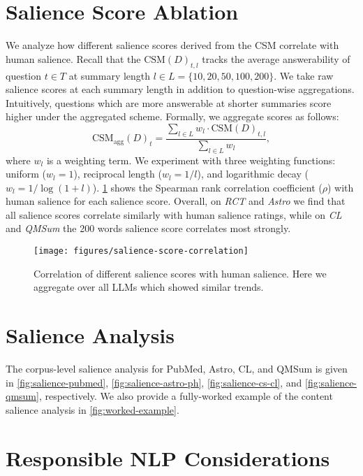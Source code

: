 \section{Salience Score Ablation}
\label{sec:appendix-salience-score-ablation}
We analyze how different salience scores derived from the CSM correlate with human salience.
Recall that the $\text{CSM}(D)_{t,l}$ tracks the average answerability of question $t \in T$ at summary length $l \in L = \{10,20,50,100,200\}$.
We take raw salience scores at each summary length in addition to question-wise aggregations.
Intuitively, questions which are more answerable at shorter summaries score higher under the aggregated scheme.
Formally, we aggregate scores as follows:
%
\begin{equation*}
\text{CSM}_{\text{agg}}(D)_{t} = \frac{\sum_{l \in L} w_l \cdot \text{CSM}(D)_{t,l}}{\sum_{l \in L} w_l},
\end{equation*}
%
where $w_l$ is a weighting term. We experiment with three weighting functions: uniform ($w_l = 1$), reciprocal length ($w_l = 1/l$), and logarithmic decay ($w_l = 1/\log(1 + l)$).
\cref{fig:salience-score-correlation} shows the Spearman rank correlation coefficient ($\rho$) with human salience for each salience score.
Overall, on \emph{RCT} and \emph{Astro} we find that all salience scores correlate similarly with human salience ratings, while on \emph{CL} and \emph{QMSum} the 200 words salience score correlates most strongly.

\begin{figure}[t]
\texttt{[image: figures/salience-score-correlation]}
\caption{Correlation of different salience scores with human salience. Here we aggregate over all LLMs which showed similar trends.}
\label{fig:salience-score-correlation}
\end{figure}

\section{Salience Analysis}
\label{sec:appendix-salience}
The corpus-level salience analysis for PubMed, Astro, CL, and QMSum is given in \cref{fig:salience-pubmed}, \cref{fig:salience-astro-ph}, \cref{fig:salience-cs-cl}, and \cref{fig:salience-qmsum}, respectively. We also provide a fully-worked example of the content salience analysis in \cref{fig:worked-example}.

\section{Responsible NLP Considerations}
